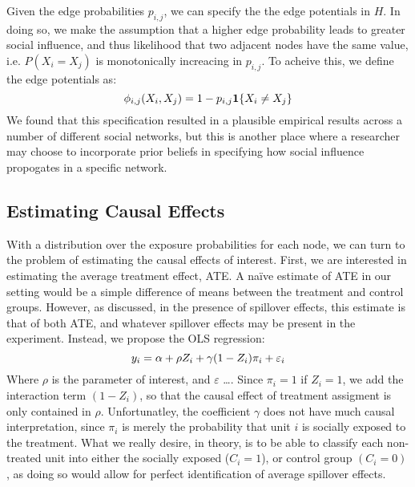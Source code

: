 \documentclass{article}
\begin{document}
Given the edge probabilities $p_{i,j}$, we can specify the the edge potentials in $H$. In doing so, 
we make the assumption that a higher edge probability leads to greater social influence, and thus likelihood that two adjacent nodes 
have the same value, i.e. $P(X_i = X_j)$ is monotonically increacing in $p_{i,j}$. To acheive this, we define the edge potentials as:
\begin{displaymath}
  \phi_{i,j}(X_i, X_j) = 1 - p_{i,j}\mathbf{1}\{{X_i \neq X_j}\} \\[0.5ex]
\end{displaymath}
We found that this specification resulted in a plausible empirical results across a number of different social networks, but this is another place where a researcher may choose to 
incorporate prior beliefs in specifying how social influence propogates in a specific network.


\subsection{Estimating Causal Effects}

With a distribution over the exposure probabilities for each node, we can turn to the problem of estimating the causal effects of interest. 
First, we are interested in estimating the average treatment effect, ATE. A naïve estimate of ATE in our setting would be a simple difference of means 
between the treatment and control groups. However, as discussed, in the presence of spillover effects, this estimate is that of both ATE, and whatever spillover 
effects may be present in the experiment. Instead, we propose the OLS regression: 
\begin{displaymath}
  y_i = \alpha + \rho Z_i + \gamma (1 - Z_i) \pi_i + \varepsilon_i \\[1.0ex]
\end{displaymath}
Where $\rho$ is the parameter of interest, and $\varepsilon$ \dots . Since $\pi_i = 1$ if $Z_i = 1$, we add the interaction term $(1 - Z_i)$, so that the causal effect of
treatment assigment is only contained in $\rho$. Unfortunatley, the coefficient $\gamma$ does not have much causal interpretation, since $\pi_i$ is merely the probability that unit $i$
is socially exposed to the treatment. What we really desire, in theory, is to be able to classify each non-treated unit into either the socially exposed ($C_i = 1$), or control group $(C_i = 0)$, as doing so 
would allow for perfect identification of average spillover effects. 
\end{document}
